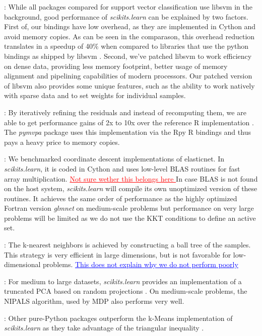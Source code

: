 \documentclass[twoside,11pt]{article}
\newcommand{\GAEL}[1]{\textcolor{blue}{\uline{#1}}}
\newcommand{\FABIAN}[1]{\textcolor{red}{\uline{#1}}}
\begin{document}
\smallskip
{}:
%
While all packages compared for support vector classification use
libsvm \citep{chang2001} in the background, good performance of
\emph{scikits.learn} can be explained by two factors. First of, our
bindings have low overhead, as they are implemented in Cython and
avoid memory copies. As can be seen in the comparason, this overhead
reduction translates in a speedup of 40\% when compared to libraries
that use the python bindings as shipped by libsvm \citep{chang2001}.
Second, we've patched libsvm to work efficiency on dense data,
providing less memory footprint, better usage of memory alignment and
pipelining capabilities of modern processors. Our patched version of
libsvm also provides some unique features, such as the ability to work
natively with sparse data and to set weights for individual samples.


\smallskip
{}:
By iteratively refining the residuals and instead of recomputing them,
we are able to get performance gains of 2x to 10x over the reference R
implementation \citep{LARS}. The {\sl pymvpa} package uses this
implementation via the Rpy R bindings and thus pays a heavy price to
memory copies.


\smallskip
{}:
%
We benchmarked coordinate descent implementations of elasticnet.  In
\emph{scikits.learn}, it is coded in Cython and uses low-level BLAS
routines for fast array multiplication. \FABIAN{Not sure wether this
  belongs here }In case BLAS is not found on the host system,
\emph{scikits.learn} will compile its own unoptimized version of these
routines.  It achieves the same order of performance as the highly
optimized Fortran version \emph{glmnet} \citep{friedman2010} on
medium-scale problems but performance on very large problems will be
limited as we do not use the KKT conditions to define an active set.

\smallskip
{}:
%
The k-nearest neighbors is achieved by constructing a ball
tree \citep{omohundro1989} of the samples. This strategy is very
efficient in large dimensions, but is not favorable for low-dimensional
problems. \GAEL{This does not explain why we do not perform poorly}

\smallskip
{}:
%
For medium to large datasets, \emph{scikits.learn} provides an
implementation of a truncated PCA based on random projections
\citep{rokhlin2009}. On medium-scale problems, the NIPALS algorithm, used
by MDP also performs very well.

\smallskip
{}:
%
Other pure-Python packages outperform the k-Means implementation of
\emph{scikits.learn} as they take advantage of the triangular inequality
\citep{elkan2003}.
\end{document}
